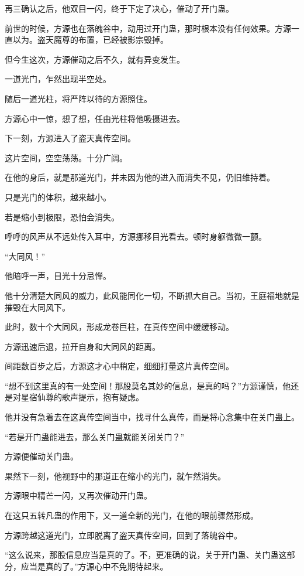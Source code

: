 \begin{this_body}
再三确认之后，他双目一闪，终于下定了决心，催动了开门蛊。

前世的时候，方源也在落魄谷中，动用过开门蛊，那时根本没有任何效果。方源一直以为。盗天魔尊的布置，已经被影宗毁掉。

但今生这次，方源催动之后不久，就有异变发生。

一道光门，乍然出现半空处。

随后一道光柱，将严阵以待的方源照住。

方源心中一惊，想了想，任由光柱将他吸摄进去。

下一刻，方源进入了盗天真传空间。

这片空间，空空荡荡。十分广阔。

在他的身后，就是那道光门，并未因为他的进入而消失不见，仍旧维持着。

只是光门的体积，越来越小。

若是缩小到极限，恐怕会消失。

呼呼的风声从不远处传入耳中，方源挪移目光看去。顿时身躯微微一颤。

“大同风！”

他暗呼一声，目光十分忌惮。

他十分清楚大同风的威力，此风能同化一切，不断抓大自己。当初，王庭福地就是摧毁在大同风下。

此时，数十个大同风，形成龙卷巨柱，在真传空间中缓缓移动。

方源迅速后退，拉开自身和大同风的距离。

间距数百步之后，方源这才心中稍定，细细打量这片真传空间。

“想不到这里真的有一处空间！那股莫名其妙的信息，是真的吗？”方源谨慎，他还是对星宿仙尊的歌声提示，抱有疑虑。

他并没有急着去在这真传空间当中，找寻什么真传，而是将心念集中在关门蛊上。

“若是开门蛊能进去，那么关门蛊就能关闭关门？”

方源便催动关门蛊。

果然下一刻，他视野中的那道正在缩小的光门，就乍然消失。

方源眼中精芒一闪，又再次催动开门蛊。

在这只五转凡蛊的作用下，又一道全新的光门，在他的眼前骤然形成。

方源跨越这道光门，立即脱离了盗天真传空间，回到了落魄谷中。

“这么说来，那股信息应当是真的了。不，更准确的说，关于开门蛊、关门蛊这部分，应当是真的了。”方源心中不免期待起来。


\end{this_body}
